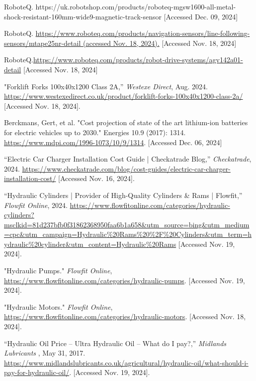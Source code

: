 \documentclass[12pt,titlepage]{article}
\begin{document}
\printbibliography
{}
\begin{thebibliography}{99}

\footnotesize
\setlength{\baselineskip}{0.8\baselineskip}

 RoboteQ. https://uk.robotshop.com/products/roboteq-mgsw1600-all-metal-shock-resistant-160mm-wide9-magnetic-track-sensor [Accessed Dec. 09, 2024]

 RoboteQ. \url{https://www.roboteq.com/products/navigation-sensors/line-following-sensors/mtape25nr-detail (accessed Nov. 18, 2024).} [Accessed Nov. 18, 2024]

 RoboteQ.\url{https://www.roboteq.com/products/robot-drive-systems/agv142a01-detail} [Accessed Nov. 18, 2024]

 "Forklift Forks 100x40x1200 Class 2A,” \textit{Westexe Direct}, Aug. 2024. \url{https://www.westexedirect.co.uk/product/forklift-forks-100x40x1200-class-2a/} [Accessed Nov. 18, 2024].

 Berckmans, Gert, et al. "Cost projection of state of the art lithium-ion batteries for electric vehicles up to 2030." Energies 10.9 (2017): 1314. \url{https://www.mdpi.com/1996-1073/10/9/1314}. [Accessed Dec. 06, 2024]

 “Electric Car Charger Installation Cost Guide | Checkatrade Blog,” \textit{Checkatrade}, 2024. \url{https://www.checkatrade.com/blog/cost-guides/electric-car-charger-installation-cost/} [Accessed Nov. 16, 2024].

 “Hydraulic Cylinders | Provider of High-Quality Cylinders \& Rams | Flowfit,” \textit{Flowfit Online}, 2024. \url{https://www.flowfitonline.com/categories/hydraulic-cylinders?msclkid=81d237bfb0f31862368950faa6b1a658&utm_source=bing&utm_medium=cpc&utm_campaign=Hydraulic%20Rams%20%2F%20Cylinders&utm_term=hydraulic%20cylinder&utm_content=Hydraulic%20Rams} [Accessed Nov. 19, 2024].

 "Hydraulic Pumps." \textit{Flowfit Online}, \url{https://www.flowfitonline.com/categories/hydraulic-pumps}. [Accessed Nov. 19, 2024].

 "Hydraulic Motors." \textit{Flowfit Online}, \url{https://www.flowfitonline.com/categories/hydraulic-motors}. [Accessed Nov. 18, 2024].

 “Hydraulic Oil Price – Ultra Hydraulic Oil – What do I pay?,” \textit{Midlands Lubricants} , May 31, 2017. \url{https://www.midlandslubricants.co.uk/agricultural/hydraulic-oil/what-should-i-pay-for-hydraulic-oil/}. [Accessed Nov. 19, 2024].


\end{thebibliography}
\end{document}
